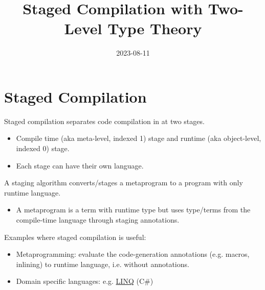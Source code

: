 \documentclass[handout]{beamer}
\title{Staged Compilation with Two-Level Type Theory}
\date{2023-08-11}
\begin{document}
\frame{\titlepage}

\section{Staged Compilation}
\begin{frame}{\secname}
Staged compilation separates code compilation in at two stages.
\begin{itemize}
    \item \pause Compile time (aka meta-level, indexed 1) stage and runtime (aka object-level, indexed 0) stage.
    \item \pause Each stage can have their own language.
\end{itemize}
\pause 
A staging algorithm converts/stages a metaprogram to a program with only runtime language.  
\begin{itemize}
    \item\pause A metaprogram is a term with runtime type but uses type/terms from the compile-time language through staging annotations.
\end{itemize}
\pause
Examples where staged compilation is useful:
    \begin{itemize}
        \item\pause  Metaprogramming: evaluate the code-generation annotations (e.g. macros, inlining) to runtime language, i.e. without annotations.
        \item\pause  Domain specific languages: e.g. \href{https://learn.microsoft.com/en-us/dotnet/csharp/programming-guide/concepts/linq/standard-query-operators-overview}{LINQ} (C\#)
    \end{itemize}
\end{frame}
\end{document}
